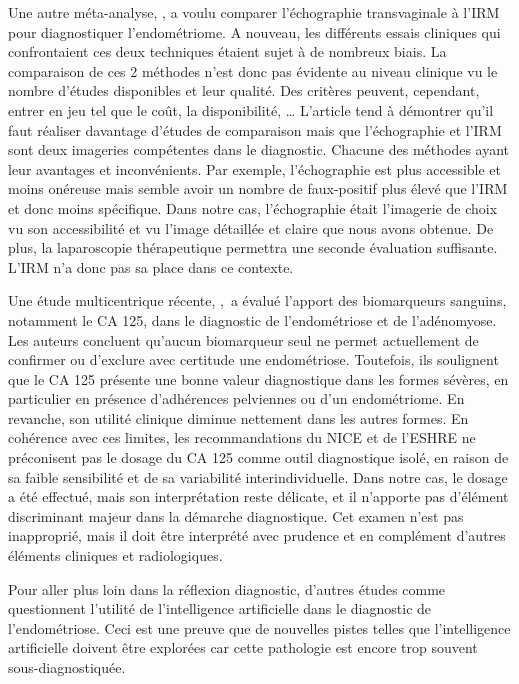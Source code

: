 Une autre méta-analyse, \textcite{kanti2024ultrasound}, a voulu comparer l’échographie transvaginale à l’IRM pour diagnostiquer l’endométriome. A nouveau, les différents essais cliniques qui confrontaient ces deux techniques étaient sujet à de nombreux biais. La comparaison de ces 2 méthodes n’est donc pas évidente au niveau clinique vu le nombre d’études disponibles et leur qualité. Des critères peuvent, cependant, entrer en jeu tel que le coût, la disponibilité, \ldots{ } L’article tend à démontrer qu’il faut réaliser davantage d’études de comparaison mais que l’échographie et l’IRM sont deux imageries compétentes dans le diagnostic. Chacune des méthodes ayant leur avantages et inconvénients. Par exemple, l’échographie est plus accessible et moins onéreuse mais semble avoir un nombre de faux-positif plus élevé que l’IRM et donc moins spécifique. Dans notre cas, l’échographie était l’imagerie de choix vu son accessibilité et vu l’image détaillée et claire que nous avons obtenue. De plus, la laparoscopie thérapeutique permettra une seconde évaluation suffisante. L’IRM n’a donc pas sa place dans ce contexte.

Une étude multicentrique récente, \textcite{burghaus2024}\mbox{, }a évalué l’apport des biomarqueurs sanguins, notamment le CA 125, dans le diagnostic de l’endométriose et de l’adénomyose. Les auteurs concluent qu’aucun biomarqueur seul ne permet actuellement de confirmer ou d’exclure avec certitude une endométriose. Toutefois, ils soulignent que le CA 125 présente une bonne valeur diagnostique dans les formes sévères, en particulier en présence d’adhérences pelviennes ou d’un endométriome. En revanche, son utilité clinique diminue nettement dans les  autres formes. En cohérence avec ces limites, les recommandations du NICE et de l’ESHRE ne préconisent pas le dosage du CA 125 comme outil diagnostique isolé, en raison de sa faible sensibilité et de sa variabilité interindividuelle. Dans notre cas, le dosage a été effectué, mais son interprétation reste délicate, et il n’apporte pas d’élément discriminant majeur dans la démarche diagnostique. Cet examen n’est pas inapproprié, mais il doit être interprété avec prudence et en complément d'autres éléments cliniques et radiologiques.

Pour aller plus loin dans la réflexion diagnostic, d’autres études comme \textcite{jiang2022diagnosis} questionnent l’utilité de l’intelligence artificielle dans le diagnostic de l’endométriose. Ceci est une preuve que de nouvelles pistes telles que l’intelligence artificielle doivent être explorées  car cette pathologie est encore trop souvent sous-diagnostiquée.

